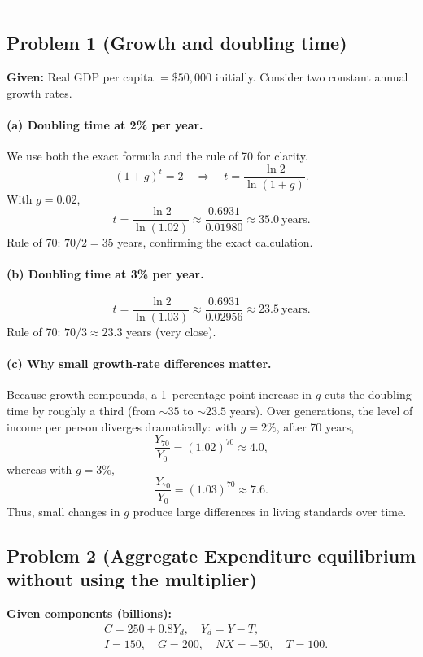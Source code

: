 \documentclass[12pt]{article}
\begin{document}
\hrule
\vspace{10pt}

\newpage
\subsection*{Problem 1 (Growth and doubling time)}
\textbf{Given:} Real GDP per capita $= \$50{,}000$ initially. Consider two constant annual growth rates.

\paragraph{(a) Doubling time at 2\% per year.}
We use both the exact formula and the rule of 70 for clarity.
\[
(1+g)^t=2 \quad \Rightarrow \quad t=\frac{\ln 2}{\ln(1+g)}.
\]
With $g=0.02$,
\[
t=\frac{\ln 2}{\ln(1.02)}\approx \frac{0.6931}{0.01980}\approx 35.0\ \text{years}.
\]
Rule of 70: $70/2=35$ years, confirming the exact calculation.

\paragraph{(b) Doubling time at 3\% per year.}
\[
t=\frac{\ln 2}{\ln(1.03)}\approx \frac{0.6931}{0.02956}\approx 23.5\ \text{years}.
\]
Rule of 70: $70/3\approx 23.3$ years (very close).

\paragraph{(c) Why small growth-rate differences matter.}
Because growth compounds, a 1~percentage point increase in $g$ cuts the doubling time by roughly a third (from $\sim 35$ to $\sim 23.5$ years). Over generations, the level of income per person diverges dramatically: with $g=2\%$, after 70 years,
\[
\frac{Y_{70}}{Y_0}=(1.02)^{70}\approx 4.0,
\]
whereas with $g=3\%$,
\[
\frac{Y_{70}}{Y_0}=(1.03)^{70}\approx 7.6.
\]
Thus, small changes in $g$ produce large differences in living standards over time.

\bigskip
\subsection*{Problem 2 (Aggregate Expenditure equilibrium without using the multiplier)}
\textbf{Given components (billions):}
\[
\begin{aligned}
& C = 250 + 0.8Y_d,\quad Y_d=Y-T, \\
& I = 150,\quad G = 200,\quad NX=-50,\quad T=100.
\end{aligned}
\]
\end{document}
